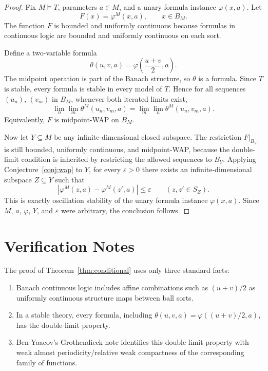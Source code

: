 \documentclass[11pt]{article}
\begin{document}
\begin{proof}
Fix \(M\models T\), parameters \(a\in M\), and a unary formula instance
\(\varphi(x,a)\).  Let
\[
  F(x)=\varphi^M(x,a), \qquad x\in B_M .
\]
The function \(F\) is bounded and uniformly continuous because formulas in
continuous logic are bounded and uniformly continuous on each sort.

Define a two-variable formula
\[
  \theta(u,v,a)=\varphi\left(\frac{u+v}{2},a\right).
\]
The midpoint operation is part of the Banach structure, so \(\theta\) is a
formula.  Since \(T\) is stable, every formula is stable in every model of
\(T\).  Hence for all sequences \((u_n)\), \((v_m)\) in \(B_M\), whenever both
iterated limits exist,
\[
  \lim_n\lim_m \theta^M(u_n,v_m,a)
  =
  \lim_m\lim_n \theta^M(u_n,v_m,a).
\]
Equivalently, \(F\) is midpoint-WAP on \(B_M\).

Now let \(Y\subseteq M\) be any infinite-dimensional closed subspace.  The
restriction \(F|_{B_Y}\) is still bounded, uniformly continuous, and
midpoint-WAP, because the double-limit condition is inherited by restricting
the allowed sequences to \(B_Y\).  Applying Conjecture~\ref{conj:wap} to
\(Y\), for every \(\varepsilon>0\) there exists an infinite-dimensional
subspace \(Z\subseteq Y\) such that
\[
  |\varphi^M(z,a)-\varphi^M(z',a)|\leq \varepsilon
  \qquad (z,z'\in S_Z).
\]
This is exactly oscillation stability of the unary formula instance
\(\varphi(x,a)\).  Since \(M\), \(a\), \(\varphi\), \(Y\), and
\(\varepsilon\) were arbitrary, the conclusion follows.
\end{proof}

\section*{Verification Notes}

The proof of Theorem~\ref{thm:conditional} uses only three standard facts:

\begin{enumerate}[leftmargin=*]
\item Banach continuous logic includes affine combinations such as
  \((u+v)/2\) as uniformly continuous structure maps between ball sorts.
\item In a stable theory, every formula, including
  \(\theta(u,v,a)=\varphi((u+v)/2,a)\), has the double-limit property.
\item Ben Yaacov's Grothendieck note identifies this double-limit property
  with weak almost periodicity/relative weak compactness of the corresponding
  family of functions.
\end{enumerate}
\end{document}
